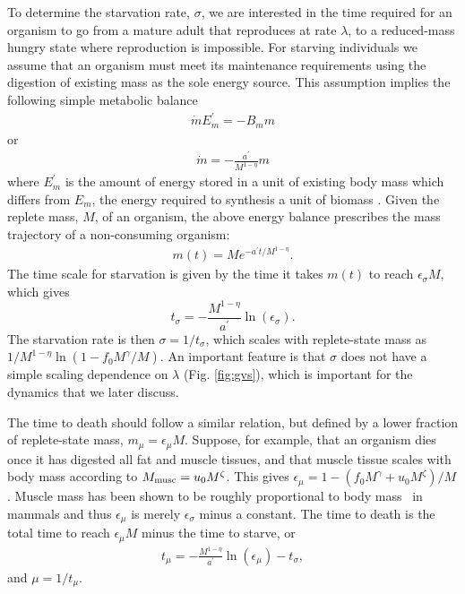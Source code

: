 \documentclass{pnastwo}
\begin{document}
\begin{article}
To determine the starvation rate, $\sigma$, we are interested in the time
required for an organism to go from a mature adult that reproduces at rate
$\lambda$, to a
reduced-mass hungry state where reproduction is impossible.  For starving individuals we assume that an organism must meet its maintenance requirements using the digestion of existing mass as the sole energy source.
This assumption implies the following simple metabolic balance 
\begin{eqnarray}
\dot{m}E_{m}^{\prime}=-B_{m}m
\end{eqnarray}
or
\begin{eqnarray}
\dot{m}=-\frac{a^{\prime}}{M^{1-\eta}}m
\end{eqnarray}
where $E_{m}^{\prime}$ is the amount of energy stored in a unit of existing
body mass which differs from $E_{m}$, the energy required to
synthesis a unit of biomass \cite{hou}. Given the replete mass, $M$, of an organism, the
above energy balance prescribes the mass trajectory of a non-consuming
organism:
\begin{eqnarray}
\label{mt}
m\left(t\right)=Me^{-a^{\prime}t/M^{1-\eta}}.
\end{eqnarray}
The time scale for starvation is
given by the time it takes $m(t)$ to reach $\epsilon_{\sigma} M$, which gives
\begin{equation}
\label{eq:sigma}
t_{\sigma}=-\frac{M^{1-\eta}}{a^{\prime}}\ln\left(\epsilon_{\sigma}\right).
\end{equation}
The starvation rate is then $\sigma=1/t_{\sigma}$, which scales with
replete-state mass as $1/M^{1-\eta}\ln\left(1-f_{0}M^{\gamma}/M\right)$.  An important
feature is that $\sigma$ does not have a simple scaling dependence on
$\lambda$ (Fig. \ref{fig:gvs}), which is important for the dynamics that we
later discuss.

The time to death should follow a similar relation, but defined by a lower
fraction of replete-state mass, $m_{\mu}=\epsilon_{\mu} M$.
Suppose, for example, that an organism dies once it has digested all fat and
muscle tissues, and that muscle tissue scales with body mass according to
$M_{\rm musc}=u_{0}M^{\zeta}$.  This gives
$\epsilon_{\mu}=1-\left(f_{0}M^{\gamma}+u_{0}M^{\zeta}\right)/M$. Muscle
mass has been shown to be roughly proportional to body mass~\cite{Folland:2008ij} in
mammals and thus $\epsilon_{\mu}$ is merely $\epsilon_{\sigma}$ minus a constant. The time to death is the total time to reach $\epsilon_{\mu}M$ minus the time to starve, or
\begin{eqnarray}
t_{\mu}=-\frac{M^{1-\eta}}{a^{\prime}}\ln\left(\epsilon_{\mu}\right)-t_{\sigma},
\end{eqnarray}
and $\mu=1/t_{\mu}$. 


\end{article}
\end{document}
